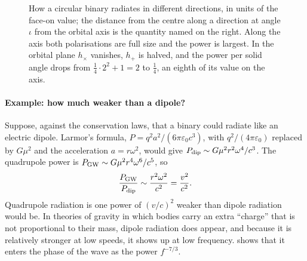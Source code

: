 \begin{figure}[htbp]
\centering
{}
\caption{How a circular binary radiates in different directions, in units of the face-on value; the distance from the centre along a direction at angle $\iota$ from the orbital axis is the quantity named on the right. Along the axis both polarisations are full size and the power is largest. In the orbital plane $h_\times$ vanishes, $h_+$ is halved, and the power per solid angle drops from $\tfrac14\cdot2^2+1=2$ to $\tfrac14$, an eighth of its value on the axis.}
\label{T2g:fig:pattern}
\end{figure}

\paragraph{Example: how much weaker than a dipole?}
Suppose, against the conservation laws, that a binary could radiate like an electric dipole. Larmor's formula, $P=q^2a^2/(6\pi\varepsilon_0c^3)$, with $q^2/(4\pi\varepsilon_0)$ replaced by $G\mu^2$ and the acceleration $a=r\omega^2$, would give $P_{\rm dip}\sim G\mu^2r^2\omega^4/c^3$. The quadrupole power is $P_{\rm GW}\sim G\mu^2r^4\omega^6/c^5$, so
\begin{equation*}
  \frac{P_{\rm GW}}{P_{\rm dip}}\sim\frac{r^2\omega^2}{c^2}=\frac{v^2}{c^2}.
\end{equation*}
Quadrupole radiation is one power of $(v/c)^2$ weaker than dipole radiation would be. In theories of gravity in which bodies carry an extra ``charge'' that is not proportional to their mass, dipole radiation does appear, and because it is relatively stronger at low speeds, it shows up at low frequency.  shows that it enters the phase of the wave as the power $f^{-7/3}$.

